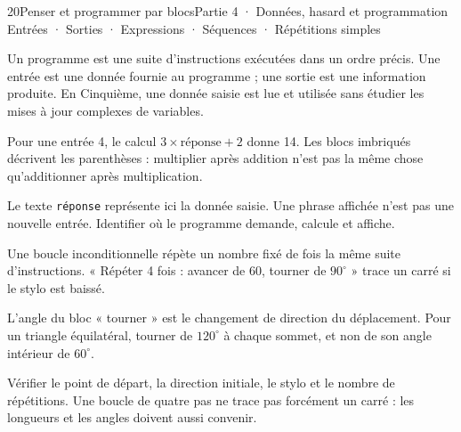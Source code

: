 \begin{ouverture}[algorithmique]{20}{Penser et programmer par blocs}{Partie 4 · Données, hasard et programmation}
{Entrées · Sorties · Expressions · Séquences · Répétitions simples}
\end{ouverture}
\pagestyle{otMain}\essentiel\fontsize{11}{15}\selectfont
{}\label{cours-20-1}
\begin{definition}Un programme est une suite d’instructions exécutées dans un ordre précis. Une entrée est une donnée fournie au programme ; une sortie est une information produite. En Cinquième, une donnée saisie est lue et utilisée sans étudier les mises à jour complexes de variables.\end{definition}
\label{fig-cours-20-1-cours-programme}

\begin{savoirfaire}Pour une entrée 4, le calcul $3\times\text{réponse}+2$ donne 14. Les blocs imbriqués décrivent les parenthèses : multiplier après addition n’est pas la même chose qu’additionner après multiplication.\end{savoirfaire}
\begin{attention}Le texte \texttt{réponse} représente ici la donnée saisie. Une phrase affichée n’est pas une nouvelle entrée. Identifier où le programme demande, calcule et affiche.\end{attention}
\clearpage
{}\label{cours-20-2}
\begin{definition}Une boucle inconditionnelle répète un nombre fixé de fois la même suite d’instructions. « Répéter 4 fois : avancer de 60, tourner de $90^\circ$ » trace un carré si le stylo est baissé.\end{definition}
\label{fig-cours-20-2-cours-boucle}

\begin{savoirfaire}L’angle du bloc « tourner » est le changement de direction du déplacement. Pour un triangle équilatéral, tourner de $120^\circ$ à chaque sommet, et non de son angle intérieur de $60^\circ$.\end{savoirfaire}
\begin{attention}Vérifier le point de départ, la direction initiale, le stylo et le nombre de répétitions. Une boucle de quatre pas ne trace pas forcément un carré : les longueurs et les angles doivent aussi convenir.\end{attention}

